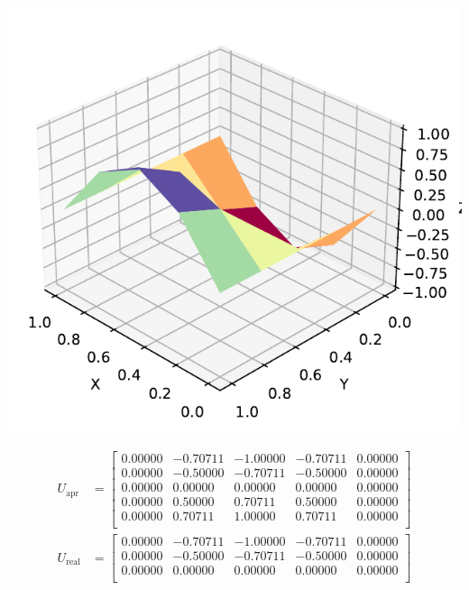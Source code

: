 \documentclass[a4paper, 11pt]{report}
\begin{document}
\begin{enumerate}[leftmargin=*]
    \begin{minipage}{0.35\columnwidth}
        \includegraphics[width=\columnwidth]{../edp/12.3_1.pdf}
    \end{minipage}
    \begin{minipage}{0.6\columnwidth}
        \begin{align*}
            U_{\text{apr}} &= 
            \begin{bmatrix}
                0.00000 & -0.70711 &  -1.00000 &  -0.70711 &  0.00000\\  
                0.00000 & -0.50000 &  -0.70711 &  -0.50000 &  0.00000\\  
                0.00000 &  0.00000 &   0.00000 &   0.00000 &  0.00000\\  
                0.00000 &  0.50000 &   0.70711 &   0.50000 &  0.00000\\  
                0.00000 &  0.70711 &   1.00000 &   0.70711 &  0.00000\\    
            \end{bmatrix}\\
            U_{\text{real}} &=
            \begin{bmatrix}
                0.00000 & -0.70711 & -1.00000 &  -0.70711 &  0.00000\\  
                0.00000 & -0.50000 & -0.70711 &  -0.50000 &  0.00000\\  
                0.00000 &  0.00000 &  0.00000 &   0.00000 &  0.00000\\  

\end{bmatrix}
\end{align*}
\end{minipage}
\end{enumerate}
\end{document}
